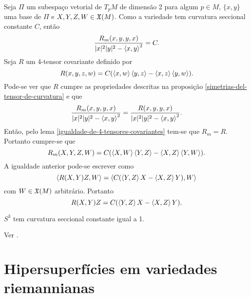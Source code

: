 \begin{demonstracao}
	Seja $\Pi$ um subespaço vetorial de $T_p M$ de dimensão 2 para algum $p \in M$, $\{x,y\}$ uma base de $\Pi$ e $X,Y,Z,W \in \mathfrak{X}(M)$. Como a variedade tem curvatura seccional constante $C$, então
	\begin{equation*}
	\frac{R_m(x,y,y,x)}{|x|^2 |y|^2 - \left\langle x,y \right\rangle^2} = C.
	\end{equation*}
	Seja $R$ um 4-tensor covariante definido por
	\begin{equation*}
	R(x,y,z,w) = C (\left\langle x,w \right\rangle \left\langle y,z \right\rangle - \left\langle x,z \right\rangle \left\langle y,w \right\rangle).
	\end{equation*}
	Pode-se ver que $R$ cumpre as propriedades descritas na proposição \ref{simetrias-del-tensor-de-curvatura} e que
	\begin{equation*}
	\frac{R_m(x,y,y,x)}{|x|^2 |y|^2 - \left\langle x,y \right\rangle^2} = \frac{R(x,y,y,x)}{|x|^2 |y|^2 - \left\langle x,y \right\rangle^2}.
	\end{equation*}
	Então, pelo lema \ref{igualdade-de-4-tensores-covariantes} tem-se que $R_m = R$. Portanto cumpre-se que
	\begin{equation*}
	R_m(X,Y,Z,W) = C(\left\langle X,W \right\rangle \left\langle Y,Z \right\rangle - \left\langle X,Z \right\rangle \left\langle Y,W \right\rangle).
	\end{equation*}
	A igualdade anterior pode-se escrever como
	\begin{equation*}
	\left\langle R(X,Y)Z,W \right\rangle =  \left\langle C(\left\langle Y,Z \right\rangle X - \left\langle X,Z \right\rangle Y),W \right\rangle
	\end{equation*}
	com $W \in \mathfrak{X}(M)$ arbitrário. Portanto
	\begin{equation*}
	R(X,Y)Z =  C(\left\langle Y,Z \right\rangle X - \left\langle X,Z \right\rangle Y).
	\end{equation*}
\end{demonstracao}

\begin{proposicao}
	$S^3$ tem curvatura seccional constante igual a 1.
\end{proposicao}

\begin{demonstracao}
	Ver \cite[Proposition 3.14, 3.47]{Gallot2004}.
\end{demonstracao}

\section{Hipersuperfícies em variedades riemannianas}

